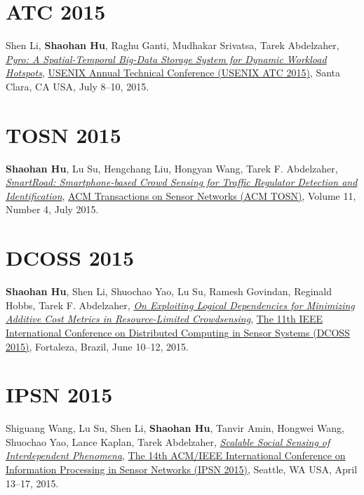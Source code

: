 \section{\sc ATC 2015}\hypertarget{li2015atc}{}
Shen Li, \textbf{Shaohan Hu}, Raghu Ganti, Mudhakar Srivatsa, Tarek Abdelzaher,
\href{https://www.usenix.org/system/files/conference/atc15/atc15-paper-li-shen.pdf}{\emph{Pyro: A Spatial-Temporal Big-Data Storage System for Dynamic Workload Hotspots}},
\href{https://www.usenix.org/conference/atc15}{\textsf{USENIX Annual Technical Conference (USENIX ATC 2015)}},
Santa Clara, CA USA, July 8--10, 2015.

\section{\sc TOSN 2015}\hypertarget{hu2015tosn}{}
\textbf{Shaohan Hu}, Lu Su, Hengchang Liu, Hongyan Wang, Tarek F. Abdelzaher,
\href{http://dl.acm.org/citation.cfm?id=2770876}{\emph{SmartRoad: Smartphone-based Crowd Sensing for Traffic Regulator Detection and Identification}},
\href{http://tosn.acm.org/}{\textsf{ACM Transactions on Sensor Networks (ACM TOSN)}},
Volume 11, Number 4, July 2015.

\section{\sc DCOSS 2015}\hypertarget{hu2015dcoss}{}
\textbf{Shaohan Hu}, Shen Li, Shuochao Yao, Lu Su, Ramesh Govindan, Reginald Hobbs, Tarek F. Abdelzaher,
\href{http://ieeexplore.ieee.org/document/7165037}{\emph{On Exploiting Logical Dependencies for Minimizing Additive Cost Metrics in Resource-Limited Crowdsensing}},
\href{http://www.dcoss.org/}{\textsf{The 11th IEEE International Conference on Distributed Computing in Sensor Systems (DCOSS 2015)}},
Fortaleza, Brazil, June 10--12, 2015.

\section{\sc IPSN 2015}\hypertarget{wang2015ipsn}{}
Shiguang Wang, Lu Su, Shen Li, \textbf{Shaohan Hu}, Tanvir Amin, Hongwei Wang, Shuochao Yao, Lance Kaplan, Tarek Abdelzaher,
\href{http://dl.acm.org/citation.cfm?id=2737114}{\emph{Scalable Social Sensing of Interdependent Phenomena}},
\href{http://ipsn.acm.org/2015/}{\textsf{The 14th ACM/IEEE International Conference on Information Processing in Sensor Networks (IPSN 2015)}},
Seattle, WA USA, April 13--17, 2015.

